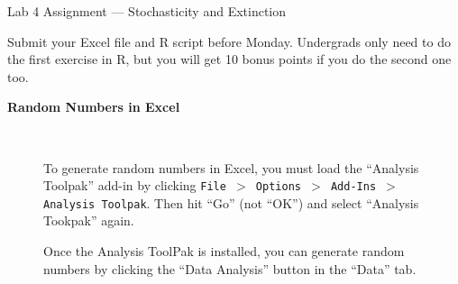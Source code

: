 \documentclass[12pt]{article}\usepackage[]{graphicx}\usepackage[]{color}
\begin{document}
{
  \Large
  \centering
  Lab 4 Assignment --- Stochasticity and Extinction \par
  \normalsize
  Submit your Excel file and R script before Monday.
  Undergrads only need to do the first exercise in R, but you will get
  10 bonus points if you do the second one too. \\
}

\vspace{12pt}

{\bf Random Numbers in Excel \\}

\begin{figure}[h]
  \centering
   \\
  \caption{To generate random numbers in Excel, you must load the
    ``Analysis Toolpak'' add-in by clicking
    {\tt File $>$ Options $>$ Add-Ins $>$ Analysis Toolpak}. Then hit
    ``Go'' (not ``OK'') and select ``Analysis Tookpak'' again.}
  \label{fig:rng}
\end{figure}

\clearpage

\begin{figure}[h]
  \centering
  \caption{\footnotesize Once the Analysis ToolPak is installed, you can generate
    random numbers by clicking the ``Data Analysis'' button in the
    ``Data'' tab.
  }
  \label{fig:rng-2}
\end{figure}
\end{document}
